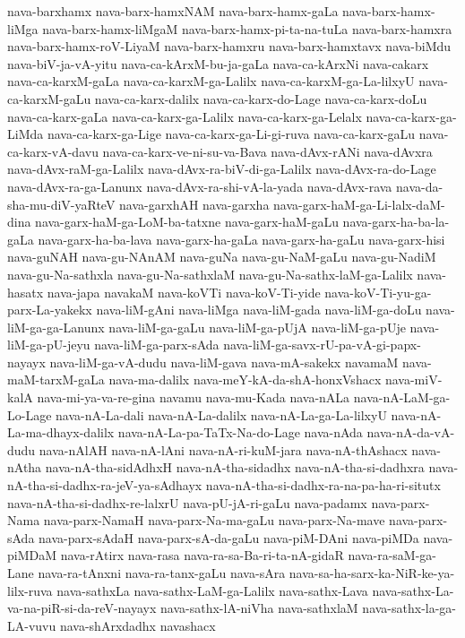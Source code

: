 {nava-barxhamx
nava-barx-hamxNAM
nava-barx-hamx-gaLa
nava-barx-hamx-liMga
nava-barx-hamx-liMgaM
nava-barx-hamx-pi-ta-na-tuLa
nava-barx-hamxra
nava-barx-hamx-roV-LiyaM
nava-barx-hamxru
nava-barx-hamxtavx
nava-biMdu
nava-biV-ja-vA-yitu
nava-ca-kArxM-bu-ja-gaLa
nava-ca-kArxNi
nava-cakarx
nava-ca-karxM-gaLa
nava-ca-karxM-ga-Lalilx
nava-ca-karxM-ga-La-lilxyU
nava-ca-karxM-gaLu
nava-ca-karx-dalilx
nava-ca-karx-do-Lage
nava-ca-karx-doLu
nava-ca-karx-gaLa
nava-ca-karx-ga-Lalilx
nava-ca-karx-ga-Lelalx
nava-ca-karx-ga-LiMda
nava-ca-karx-ga-Lige
nava-ca-karx-ga-Li-gi-ruva
nava-ca-karx-gaLu
nava-ca-karx-vA-davu
nava-ca-karx-ve-ni-su-va-Bava
nava-dAvx-rANi
nava-dAvxra
nava-dAvx-raM-ga-Lalilx
nava-dAvx-ra-biV-di-ga-Lalilx
nava-dAvx-ra-do-Lage
nava-dAvx-ra-ga-Lanunx
nava-dAvx-ra-shi-vA-la-yada
nava-dAvx-rava
nava-da-sha-mu-diV-yaRteV
nava-garxhAH
nava-garxha
nava-garx-haM-ga-Li-lalx-daM-dina
nava-garx-haM-ga-LoM-ba-tatxne
nava-garx-haM-gaLu
nava-garx-ha-ba-la-gaLa
nava-garx-ha-ba-lava
nava-garx-ha-gaLa
nava-garx-ha-gaLu
nava-garx-hisi
nava-guNAH
nava-gu-NAnAM
nava-guNa
nava-gu-NaM-gaLu
nava-gu-NadiM
nava-gu-Na-sathxla
nava-gu-Na-sathxlaM
nava-gu-Na-sathx-laM-ga-Lalilx
nava-hasatx
nava-japa
navakaM
nava-koVTi
nava-koV-Ti-yide
nava-koV-Ti-yu-ga-parx-La-yakekx
nava-liM-gAni
nava-liMga
nava-liM-gada
nava-liM-ga-doLu
nava-liM-ga-ga-Lanunx
nava-liM-ga-gaLu
nava-liM-ga-pUjA
nava-liM-ga-pUje
nava-liM-ga-pU-jeyu
nava-liM-ga-parx-sAda
nava-liM-ga-savx-rU-pa-vA-gi-papx-nayayx
nava-liM-ga-vA-dudu
nava-liM-gava
nava-mA-sakekx
navamaM
nava-maM-tarxM-gaLa
nava-ma-dalilx
nava-meY-kA-da-shA-honxVshacx
nava-miV-kalA
nava-mi-ya-va-re-gina
navamu
nava-mu-Kada
nava-nALa
nava-nA-LaM-ga-Lo-Lage
nava-nA-La-dali
nava-nA-La-dalilx
nava-nA-La-ga-La-lilxyU
nava-nA-La-ma-dhayx-dalilx
nava-nA-La-pa-TaTx-Na-do-Lage
nava-nAda
nava-nA-da-vA-dudu
nava-nAlAH
nava-nA-lAni
nava-nA-ri-kuM-jara
nava-nA-thAshacx
nava-nAtha
nava-nA-tha-sidAdhxH
nava-nA-tha-sidadhx
nava-nA-tha-si-dadhxra
nava-nA-tha-si-dadhx-ra-jeV-ya-sAdhayx
nava-nA-tha-si-dadhx-ra-na-pa-ha-ri-situtx
nava-nA-tha-si-dadhx-re-lalxrU
nava-pU-jA-ri-gaLu
nava-padamx
nava-parx-Nama
nava-parx-NamaH
nava-parx-Na-ma-gaLu
nava-parx-Na-mave
nava-parx-sAda
nava-parx-sAdaH
nava-parx-sA-da-gaLu
nava-piM-DAni
nava-piMDa
nava-piMDaM
nava-rAtirx
nava-rasa
nava-ra-sa-Ba-ri-ta-nA-gidaR
nava-ra-saM-ga-Lane
nava-ra-tAnxni
nava-ra-tanx-gaLu
nava-sAra
nava-sa-ha-sarx-ka-NiR-ke-ya-lilx-ruva
nava-sathxLa
nava-sathx-LaM-ga-Lalilx
nava-sathx-Lava
nava-sathx-La-va-na-piR-si-da-reV-nayayx
nava-sathx-lA-niVha
nava-sathxlaM
nava-sathx-la-ga-LA-vuvu
nava-shArxdadhx
navashacx
}
